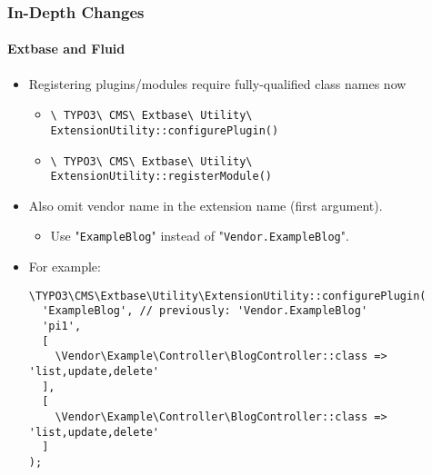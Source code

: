
\begin{frame}[fragile]
	\frametitle{In-Depth Changes}
	\framesubtitle{Extbase and Fluid}

	\lstset{basicstyle=\tiny\ttfamily}

	\begin{itemize}
		\item Registering plugins/modules require fully-qualified class names now

			\begin{itemize}\smaller
				\item \texttt{\textbackslash
					TYPO3\textbackslash
					CMS\textbackslash
					Extbase\textbackslash
					Utility\textbackslash
					ExtensionUtility::configurePlugin()}
				\item \texttt{\textbackslash
					TYPO3\textbackslash
					CMS\textbackslash
					Extbase\textbackslash
					Utility\textbackslash
					ExtensionUtility::registerModule()}
			\end{itemize}\normalsize

		\item Also omit vendor name in the extension name (first argument).

			\begin{itemize}\smaller
				\item[\ding{228}] Use "\texttt{ExampleBlog}" instead of "\texttt{Vendor.ExampleBlog}".
			\end{itemize}

		\item For example:
\begin{lstlisting}
\TYPO3\CMS\Extbase\Utility\ExtensionUtility::configurePlugin(
  'ExampleBlog', // previously: 'Vendor.ExampleBlog'
  'pi1',
  [
    \Vendor\Example\Controller\BlogController::class => 'list,update,delete'
  ],
  [
    \Vendor\Example\Controller\BlogController::class => 'list,update,delete'
  ]
);
\end{lstlisting}

	\end{itemize}

\end{frame}


